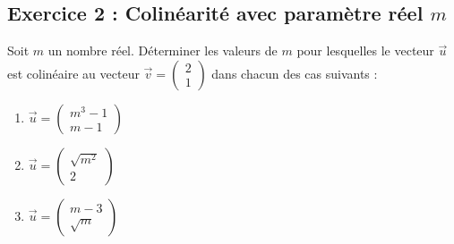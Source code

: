 \documentclass[11pt,a4paper]{article}
\begin{document}
\vspace{0.6cm}
\subsection*{Exercice 2 : Colinéarité avec paramètre réel $m$}

\begin{enoncebox}
Soit $m$ un nombre réel. Déterminer les valeurs de $m$ pour lesquelles le vecteur $\vec{u}$ est colinéaire au vecteur $\vec{v} = \begin{pmatrix} 2 \\ 1 \end{pmatrix}$ dans chacun des cas suivants :
\begin{enumerate}
    \item $\vec{u} = \begin{pmatrix} m^3 - 1 \\ m - 1 \end{pmatrix}$
    \item $\vec{u} = \begin{pmatrix} \sqrt{m^2} \\ 2 \end{pmatrix}$
    \item $\vec{u} = \begin{pmatrix} m - 3 \\ \sqrt{m} \end{pmatrix}$
\end{enumerate}
\end{enoncebox}
\end{document}
